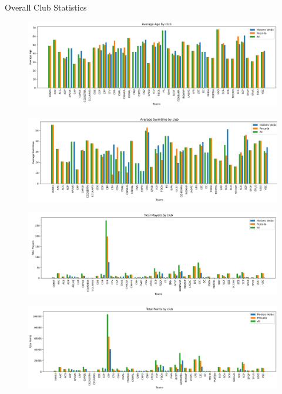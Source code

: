 \documentclass[aspectratio=169, xcolor=dvipsnames]{beamer}
\begin{document}
\begin{frame}[allowframebreaks]{Overall Club Statistics}
\begin{figure}
    \centering
    \includegraphics[width=\textwidth]{img/stats/clubfacts1.png}
\end{figure}

\begin{figure}
    \centering
    \includegraphics[width=\textwidth]{img/stats/clubfacts2.png}
\end{figure}

\begin{figure}
    \centering
    \includegraphics[width=\textwidth]{img/stats/clubfacts3.png}
\end{figure}

\begin{figure}
    \centering
    \includegraphics[width=\textwidth]{img/stats/clubfacts4.png}
\end{figure}

\end{frame}
\end{document}
